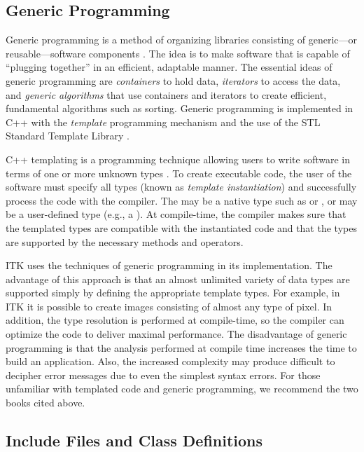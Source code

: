 \subsection{Generic Programming}
\label{sec:GenericProgramming}


Generic programming is a method of organizing libraries consisting of
generic---or reusable---software components \cite{Musser1996}. The idea is to
make software that is capable of ``plugging together'' in an efficient,
adaptable manner. The essential ideas of generic programming are
\emph{containers} to hold data, \emph{iterators} to access the data, and
\emph{generic algorithms} that use containers and iterators to create
efficient, fundamental algorithms such as sorting. Generic programming is
implemented in C++ with the \emph{template} programming mechanism and the
use of the STL Standard Template Library \cite{Austern1999}.

C++ templating is a programming technique allowing users to write software in
terms of one or more unknown types . To create executable code, the
user of the software must specify all types  (known as \emph{template
instantiation}) and successfully process the code with the compiler. The
 may be a native type such as
 or , or  may be a user-defined type (e.g.,
a ). At compile-time, the compiler makes sure that the templated
types are compatible with the instantiated code and that the types are
supported by the necessary methods and operators.

ITK uses the techniques of generic programming in its implementation. The
advantage of this approach is that an almost unlimited variety of data types
are supported simply by defining the appropriate template types. For example,
in ITK it is possible to create images consisting of almost any type of
pixel. In addition, the type resolution is performed at compile-time, so the
compiler can optimize the code to deliver maximal performance. The
disadvantage of generic programming is that the analysis performed at compile
time increases the time to build an application. Also, the increased
complexity may produce difficult to decipher error messages due to even the
simplest syntax errors. For those unfamiliar with templated code and
generic programming, we recommend the two books cited above.

\subsection{Include Files and Class Definitions}
\label{sec:IncludeFiles}

